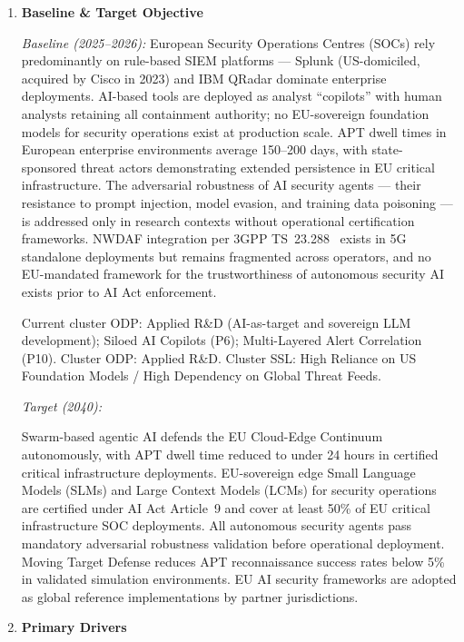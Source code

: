\begin{enumerate}

\item \textbf{Baseline \& Target Objective}

\textit{Baseline (2025--2026):}
European Security Operations Centres (SOCs) rely predominantly on rule-based SIEM platforms ---
Splunk (US-domiciled, acquired by Cisco in 2023) and IBM QRadar dominate enterprise
deployments. AI-based tools are deployed as analyst ``copilots'' with human analysts
retaining all containment authority; no EU-sovereign foundation models for security
operations exist at production scale. APT dwell times in European enterprise environments
average 150--200 days, with state-sponsored threat actors demonstrating extended persistence
in EU critical infrastructure. The adversarial robustness of AI security agents --- their
resistance to prompt injection, model evasion, and training data poisoning --- is addressed
only in research contexts without operational certification frameworks. NWDAF integration
per 3GPP TS~23.288~\cite{threeGPP23288} exists in 5G standalone deployments but remains
fragmented across operators, and no EU-mandated framework for the trustworthiness of
autonomous security AI exists prior to AI Act enforcement.

Current cluster ODP: Applied R\&D (AI-as-target and sovereign LLM development); Siloed AI
Copilots (P6); Multi-Layered Alert Correlation (P10). Cluster ODP: Applied R\&D.
Cluster SSL: High Reliance on US Foundation Models / High Dependency on Global Threat Feeds.

\textit{Target (2040):}
\begin{sloppypar}
Swarm-based agentic AI defends the EU Cloud-Edge Continuum autonomously, with APT dwell
time reduced to under 24 hours in certified critical infrastructure deployments. EU-sovereign
edge Small Language Models (SLMs) and Large Context Models (LCMs) for security operations
are certified under AI Act Article~9 and cover at least 50\% of EU critical infrastructure
SOC deployments. All autonomous security agents pass mandatory adversarial robustness
validation before operational deployment. Moving Target Defense reduces APT reconnaissance
success rates below 5\% in validated simulation environments. EU AI security frameworks
are adopted as global reference implementations by partner jurisdictions.
\end{sloppypar}

\item \textbf{Primary Drivers}


\end{enumerate}
